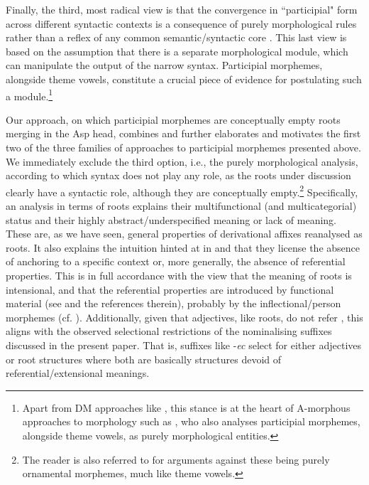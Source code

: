 \documentclass[output=paper,colorlinks,citecolor=brown]{langscibook}
\begin{document}
Finally, the third, most radical view is that the convergence in ``participial" form across different syntactic contexts is a consequence of purely morphological rules rather than a reflex of any common semantic/syntactic core \citep{Calabrese2020}. This last view is based on the assumption that there is a separate morphological module, which can manipulate the output of the narrow syntax. Participial morphemes, alongside theme vowels, constitute a crucial piece of evidence for postulating such a module.\footnote{Apart from DM approaches like \citet{Calabrese2020}, this stance is at the heart of A-morphous approaches to morphology such as \citet{Aronoff1994}, who also analyses participial morphemes, alongside theme vowels, as purely morphological entities.}

Our approach, on which participial morphemes are conceptually empty roots merging in the Asp head, combines and further elaborates and motivates the first two of the three families of approaches to participial morphemes presented above. We immediately exclude the third option, i.e., the purely morphological analysis, according to which syntax does not play any role, as the roots under discussion clearly have a syntactic role, although they are conceptually empty.\footnote{The reader is also referred to \citet{MilosArsen2022, Kovacevic2023} for arguments against these being purely ornamental morphemes, much like theme vowels.} Specifically, an analysis in terms of roots explains their multifunctional (and multicategorial) status and their highly abstract/underspecified meaning or lack of meaning. These are, as we have seen, general properties of derivational affixes reanalysed as roots. It also explains the intuition hinted at in \citet{Kratzer2000} and \citet{ramchand2018} that they license the absence of anchoring to a specific context or, more generally, the absence of referential properties. This is in full accordance with the view that the meaning of roots is intensional, and that the referential properties are introduced by functional material (see \citealt{sim+:Arsenijevic2022} and the references therein), probably by the inflectional/person morphemes (cf. \citealt{ramchand2018}). Additionally, given that adjectives, like roots, %
do not refer%
, this aligns with the observed selectional restrictions of the nominalising suffixes discussed in the present paper. That is, suffixes like -\textit{ec} select for either adjectives or root structures where both are basically structures devoid of referential/extensional meanings. 
\end{document}
